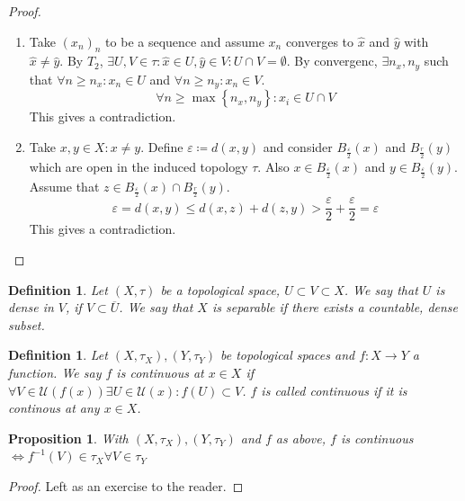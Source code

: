 \documentclass{article}
\newcounter{lecref}[section]
\numberwithin{lecref}{section}
\newtheorem{definition}[lecref]{Definition}
\newtheorem{proposition}[lecref]{Proposition}
\newcommand{\Set}[1]{\left\{#1\right\}}
\begin{document}
\begin{proof}
	\begin{enumerate}
		\item
			Take $(x_n)_n$ to be a sequence and assume $x_n$ converges to $\hat x$ and $\hat y$ with $\hat x \neq \hat y$. By $T_2$, $\exists U, V \in \tau: \hat x \in U, \hat y \in V: U \cap V = \emptyset$.
			By convergenc, $\exists n_x, n_y$ such that $\forall n \geq n_x: x_n \in U$ and $\forall n \geq n_y: x_n \in V$.
			\[ \forall n \geq \max\Set{n_x, n_y}: x_i \in U \cap V \]
			This gives a contradiction.
		\item
			Take $x, y \in X: x \neq y$. Define $\varepsilon \coloneqq d(x, y)$ and consider $B_{\frac{\varepsilon}{2}}(x)$ and $B_{\frac r2}(y)$ which are open in the induced topology $\tau$. Also $x \in B_{\frac\varepsilon2}(x)$ and $y \in B_{\frac\varepsilon2}(y)$. Assume that $z \in B_{\frac\varepsilon2}(x) \cap B_{\frac r2}(y)$.
			\[ \varepsilon = d(x, y) \leq d(x, z) + d(z, y) > \frac\varepsilon2 + \frac\varepsilon2 = \varepsilon \]
			This gives a contradiction.
	\end{enumerate}
\end{proof}

\begin{definition}
	\label{definition:1.9}
	Let $(X, \tau)$ be a topological space, $U \subset V \subset X$.
	We say that $U$ is \emph{dense} in $V$, if $V \subset \overline U$.
	We say that $X$ is \emph{separable} if there exists a countable, dense subset.
\end{definition}

\begin{definition}
	\label{definition:1.10}
	Let $(X, \tau_X), (Y, \tau_Y)$ be topological spaces and $f: X \to Y$ a function. We say $f$ is \emph{continuous} at $x \in X$ if $\forall V \in \mathcal U(f(x)) \exists U \in \mathcal U(x): f(U) \subset V$.
	$f$ is called \emph{continuous} if it is continous at any $x \in X$.
\end{definition}

\begin{proposition}
	\label{proposition:1.11}
	With $(X, \tau_X), (Y, \tau_Y)$ and $f$ as above,
	$f$ is continuous $\iff f^{-1}(V) \in \tau_X \forall V \in \tau_Y$
\end{proposition}
\begin{proof}
	Left as an exercise to the reader.
\end{proof}
\end{document}

